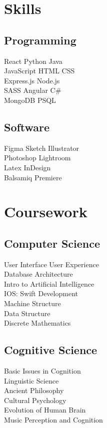 \documentclass[]{deedy-resume-openfont}
\begin{document}
\begin{minipage}[t]{0.30\textwidth}
\section{Skills}
\subsection{Programming}
React \textbullet{} Python \textbullet{} Java\\
JavaScript \textbullet{} HTML \textbullet{}   CSS \\
Express.js \textbullet{} Node.js\\
SASS \textbullet{} Angular \textbullet{} C\#\\
MongoDB \textbullet{} PSQL\\
\sectionsep

\subsection{Software}
Figma \textbullet{} Sketch \textbullet{} Illustrator\\
Photoshop \textbullet{} Lightroom\\
Latex \textbullet{} InDesign\\
Balsamiq \textbullet{} Premiere\\
\sectionsep


\section{Coursework}

\subsection{Computer Science}
User Interface User Experience\\
Database Architecture\\
Intro to Artificial Intelligence\\
IOS: Swift Development\\
Machine Structure\\
Data Structure\\
Discrete Mathematics\\
\sectionsep

\subsection{Cognitive Science}
Basic Issues in Cognition\\
Linguistic Science\\
Ancient Philosophy\\
Cultural Psychology\\
Evolution of Human Brain\\
Music Perception and Cognition\\
\sectionsep



\end{minipage}
\end{document}

